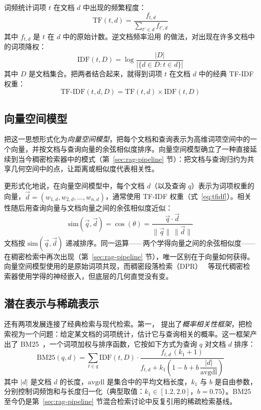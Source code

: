词频统计词项 $t$ 在文档 $d$ 中出现的频繁程度：
\begin{equation}
\mathrm{TF}(t,d) = \frac{f_{t,d}}{\sum_{t' \in d} f_{t',d}}
\label{eq:tf}
\end{equation}
其中 $f_{t,d}$ 是 $t$ 在 $d$ 中的原始计数。逆文档频率沿用 \citet{sparckjones1972statistical} 的做法，对出现在许多文档中的词项降权：
\begin{equation}
\mathrm{IDF}(t, D) = \log \frac{|D|}{|\{d \in D : t \in d\}|}
\label{eq:idf}
\end{equation}
其中 $D$ 是文档集合。把两者结合起来，就得到词项 $t$ 在文档 $d$ 中的经典 TF-IDF 权重：
\begin{equation}
\mathrm{TF\text{-}IDF}(t,d,D) = \mathrm{TF}(t,d) \times \mathrm{IDF}(t,D)
\label{eq:tfidf}
\end{equation}

\subsection{向量空间模型}

\citet{salton1975vector} 把这一思想形式化为\emph{向量空间模型}，把每个文档和查询表示为高维词项空间中的一个向量，并按文档与查询向量的余弦相似度排序。向量空间模型确立了一种直接延续到当今稠密检索器中的模式（第~\ref{sec:rag-pipeline} 节）：把文档与查询归约为共享几何空间中的点，让距离或相似度代表相关性。

更形式化地说，在向量空间模型中，每个文档 $d$（以及查询 $q$）表示为词项权重的向量，$\vec{d} = (w_{1,d}, w_{2,d}, \dots, w_{n,d})$，通常使用 TF-IDF 权重（式~\ref{eq:tfidf}）。相关性随后用查询向量与文档向量之间的余弦相似度近似：
\begin{equation}
\mathrm{sim}(\vec{q}, \vec{d}) = \cos(\theta) = \frac{\vec{q} \cdot \vec{d}}{\lVert \vec{q} \rVert \, \lVert \vec{d} \rVert}
\label{eq:cosinerag}
\end{equation}
文档按 $\mathrm{sim}(\vec{q}, \vec{d})$ 递减排序。同一运算——两个学得向量之间的余弦相似度——在稠密检索中再次出现（第~\ref{sec:rag-pipeline} 节），唯一区别在于向量如何获得。
向量空间模型使用的是原始词项共现，而稠密段落检索（DPR）~\citep{karpukhin2020dense} 等现代稠密检索器使用学得的神经嵌入，但底层的几何直觉没有变。

\subsection{潜在表示与稀疏表示}

还有两项发展连接了经典检索与现代检索。第一，\citet{robertson2009probabilistic} 提出了\emph{概率相关性框架}，把检索视为一个问题：给定某文档的词项统计，估计它与查询相关的概率。这一框架产出了 BM25~\cite{robertson1994okapi}，一个词项加权与排序函数，它按如下方式为查询 $q$ 对文档 $d$ 排序：
\begin{equation}
\mathrm{BM25}(q,d) = \sum_{t \in q} \mathrm{IDF}(t,D) \cdot
\frac{f_{t,d} \, (k_1 + 1)}{f_{t,d} + k_1 \left(1 - b + b \, \dfrac{|d|}{\mathrm{avgdl}}\right)}
\label{eq:bm25}
\end{equation}
其中 $|d|$ 是文档 $d$ 的长度，$\mathrm{avgdl}$ 是集合中的平均文档长度，$k_1$ 与 $b$ 是自由参数，分别控制词频饱和与长度归一化（典型取值：$k_1 \in [1.2, 2.0]$，$b = 0.75$）。BM25 至今仍是第~\ref{sec:rag-pipeline} 节混合检索讨论中反复引用的稀疏检索基线。

